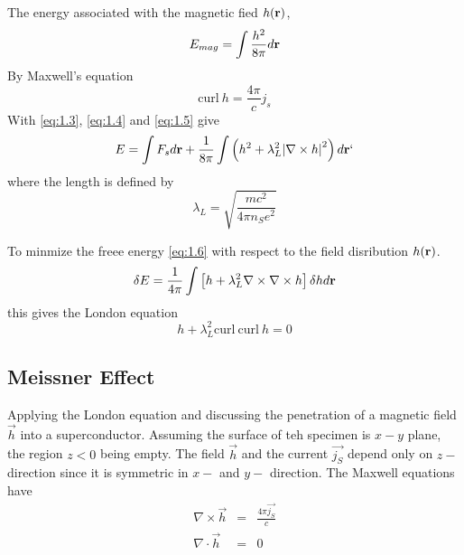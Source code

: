 The energy associated with the magnetic fied $h(\mathbf{r})$,
\begin{equation}
 E_{mag} = \int \frac{h^2}{8\pi} d \mathbf{r}
 \label{eq:1.4}
\end{equation}
By Maxwell's equation
\begin{equation}
 \mathrm{curl~} h = \frac{4\pi}{c} j_s
 \label{eq:1.5}
\end{equation}
With \eqref{eq:1.3}, \eqref{eq:1.4} and \eqref{eq:1.5} give
\begin{equation}
 E = \int F_s d \mathbf{r} + \frac{1}{8\pi} \int \left( h^2 + \lambda^2_L \abs{\nabla \times h}^2 \right) d \mathbf{r}`
 \label{eq:1.6}
\end{equation}
where the length is defined by
\begin{equation}
 \lambda_L = \sqrt{\frac{mc^2}{4\pi n_S e^2}}
 \label{eq:1.7}
\end{equation}

To minmize the freee energy \eqref{eq:1.6} with respect to the field disribution $h(\mathbf{r})$.
\begin{equation}
 \delta E = \frac{1}{4\pi} \int \left[ h + \lambda_L^2 \nabla \times \nabla \times h \right] \delta h d \mathbf{r}
 \label{eq:1.8}
\end{equation}
this gives the London equation
\begin{equation}
 h + \lambda_L^2 \mathrm{curl~} \mathrm{curl~} h = 0
 \label{eq:1.9}
\end{equation}

\subsection{Meissner Effect}
Applying the London equation and discussing the penetration of a magnetic field $\vec{h}$ into a superconductor.
Assuming the surface of teh specimen is $x-y$ plane, the region $z<0$ being empty.
The field $\vec{h}$ and the current $\vec{j_S}$ depend only on $z-$ direction since it is symmetric in $x-$ and $y-$ direction.
The Maxwell equations have
\begin{eqnarray}
 \nabla \times \vec{h} &=& \frac{4\pi \vec{j_S}}{c} \\ \label{eq:1.10}
 \nabla \cdot \vec{h} &=& 0 \label{eq:1.11}
\end{eqnarray}

